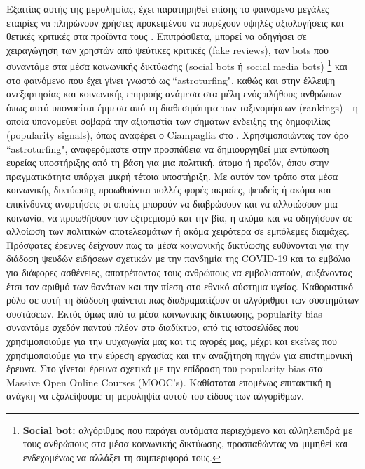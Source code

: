 Εξαιτίας αυτής της μεροληψίας, έχει παρατηρηθεί επίσης το φαινόμενο μεγάλες εταιρίες να πληρώνουν χρήστες προκειμένου να παρέχουν υψηλές αξιολογήσεις και θετικές κριτικές στα προϊόντα τους \cite{ramosNegativeImpactSocial2020}. Επιπρόσθετα, μπορεί να οδηγήσει σε χειραγώγηση των χρηστών από ψεύτικες κριτικές (fake reviews), των bots που συναντάμε στα μέσα κοινωνικής δικτύωσης (social bots ή social media bots) \footnote{\textbf{Social bot:} αλγόριθμος που παράγει αυτόματα περιεχόμενο και αλληλεπιδρά με τους ανθρώπους στα
	μέσα κοινωνικής δικτύωσης, προσπαθώντας να μιμηθεί και
	ενδεχομένως να αλλάξει τη συμπεριφορά τους.\cite{ferraraRiseSocialBots2016} } και στο φαινόμενο που έχει γίνει γνωστό ως “astroturfing", καθώς και στην έλλειψη ανεξαρτησίας και κοινωνικής επιρροής ανάμεσα στα μέλη ενός πλήθους ανθρώπων - όπως αυτό υπονοείται έμμεσα από τη διαθεσιμότητα των ταξινομήσεων (rankings) - η οποία υπονομεύει σοβαρά την αξιοπιστία των σημάτων ένδειξης της δημοφιλίας (popularity signals), όπως αναφέρει ο Ciampaglia στο  \cite{ciampagliaHowAlgorithmicPopularity2018}. Χρησιμοποιώντας τον όρο ``astroturfing", αναφερόμαστε στην προσπάθεια να δημιουργηθεί μια εντύπωση ευρείας υποστήριξης από τη βάση για μια πολιτική, άτομο ή προϊόν, όπου στην πραγματικότητα υπάρχει μικρή τέτοια υποστήριξη. Με αυτόν τον τρόπο στα μέσα κοινωνικής δικτύωσης προωθούνται πολλές φορές ακραίες, ψευδείς ή ακόμα και επικίνδυνες αναρτήσεις   οι οποίες μπορούν να διαβρώσουν και να αλλοιώσουν μια κοινωνία, να προωθήσουν τον εξτρεμισμό και την βία, ή ακόμα και να οδηγήσουν σε αλλοίωση των πολιτικών αποτελεσμάτων ή ακόμα χειρότερα σε εμπόλεμες διαμάχες. Πρόσφατες έρευνες δείχνουν πως τα μέσα κοινωνικής δικτύωσης ευθύνονται για την διάδοση ψευδών ειδήσεων σχετικών με την πανδημία της COVID-19 και τα εμβόλια για διάφορες ασθένειες, αποτρέποντας τους ανθρώπους να εμβολιαστούν, αυξάνοντας έτσι τον αριθμό των θανάτων και την πίεση στο εθνικό σύστημα υγείας. Καθοριστικό ρόλο σε αυτή τη διάδοση φαίνεται πως διαδραματίζουν οι αλγόριθμοι των συστημάτων συστάσεων. Εκτός όμως από τα μέσα κοινωνικής δικτύωσης,  popularity bias συναντάμε σχεδόν παντού πλέον στο διαδίκτυο, από τις ιστοσελίδες που χρησιμοποιούμε για την ψυχαγωγία μας  και τις αγορές μας, μέχρι και εκείνες που χρησιμοποιούμε για την εύρεση εργασίας   και την αναζήτηση πηγών για επιστημονική έρευνα. Στο \cite{borattoEffectAlgorithmicBias2019} γίνεται έρευνα σχετικά με την επίδραση του popularity bias στα Massive Open Online Courses (MOOC’s). Καθίσταται επομένως επιτακτική η ανάγκη να εξαλείψουμε  τη μεροληψία αυτού του είδους των αλγορίθμων.\\

